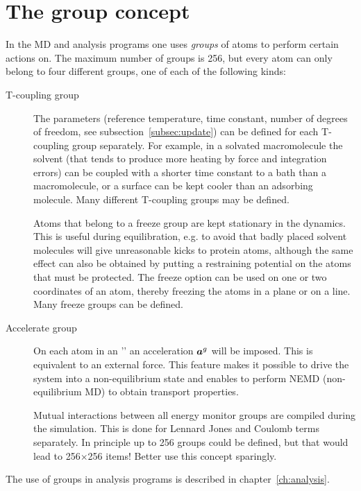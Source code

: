 \section{The group concept}
\label{sec:group}
In the {\gromacs} MD and analysis programs one uses {\em groups} of atoms
to perform certain actions on. The maximum number of groups is 256,
but every atom can only belong to four different groups, one of each
of the following kinds:
\begin{description}
\item[T-coupling group]
The  parameters (reference temperature, time
constant, number of degrees of freedom, see
subsection~\ref{subsec:update}) can be defined for each T-coupling
group separately. For example, in a solvated macromolecule the
solvent (that  tends to produce more heating by force and integration
errors)  can be coupled with a shorter time constant to a bath than a
macromolecule, or a surface can be kept cooler than an adsorbing
molecule. Many different T-coupling groups may be defined.
\item[]
Atoms that belong to a freeze group are kept stationary in the
dynamics. This is useful during equilibration, e.g. to avoid that badly
placed solvent molecules will give unreasonable kicks to  protein atoms,
although the same effect can also be obtained by putting a restraining
potential on the atoms that must be protected. The freeze option can be
used on one or two coordinates of an atom, thereby freezing the atoms
in a plane or on a line. Many freeze groups can be defined.
\item[Accelerate group]
On each atom in an '' an acceleration $\mbox{\boldmath ${a}$}^g$ will
be imposed. This is equivalent to an external force. This feature
makes it possible to drive the system into a non-equilibrium state and
enables to perform NEMD (non-equilibrium MD) to obtain transport
properties. 
\item[]
Mutual interactions between all energy monitor
groups are compiled during
the simulation. This is done for Lennard Jones and Coulomb terms separately.
In principle up to 256 groups could be defined, but that would lead to
256$\times$256 items! Better use this concept sparingly.  
\end{description}
The use of groups in analysis programs is described in
chapter~\ref{ch:analysis}.

